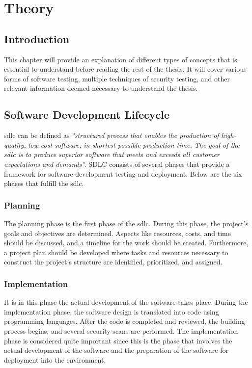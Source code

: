 \chapter{Theory}
\label{chap:Theory}

\section{Introduction}
This chapter will provide an explanation of different types of concepts that is essential to understand before reading the rest of the thesis. It will cover various forms of software testing, multiple techniques of security testing, and other relevant information deemed necessary to understand the thesis.


\section{Software Development Lifecycle}
\acrlong{sdlc} can be defined as \textit{"structured process that enables the production of high-quality, low-cost software, in shortest possible production time. The goal of the \acrshort{sdlc} is to produce superior software that meets and exceeds all customer expectations and demands"}\cite{sdlc1}.  SDLC consists of several phases that provide a framework for software development testing and deployment. Below are the six phases that fulfill the \acrshort{sdlc}. 

\subsection{Planning} 
The planning phase is the first phase of the \acrshort{sdlc}. During this phase, the project's goals and objectives are determined. Aspects like resources, costs, and time should be discussed, and a timeline for the work should be created.  Furthermore, a project plan should be developed where tasks and resources necessary to construct the project's structure are identified, prioritized, and assigned. \cite{planningphase}
 
\subsection{Implementation}
It is in this phase the actual development of the software takes place. During the implementation phase, the software design is translated into code using programming languages. After the code is completed and reviewed, the building process begins, and several security scans are performed.
The implementation phase is considered quite important since this is the phase that involves the actual development of the software and the preparation of the software for deployment into the environment.  \cite{ImplementationSDLC}
 
